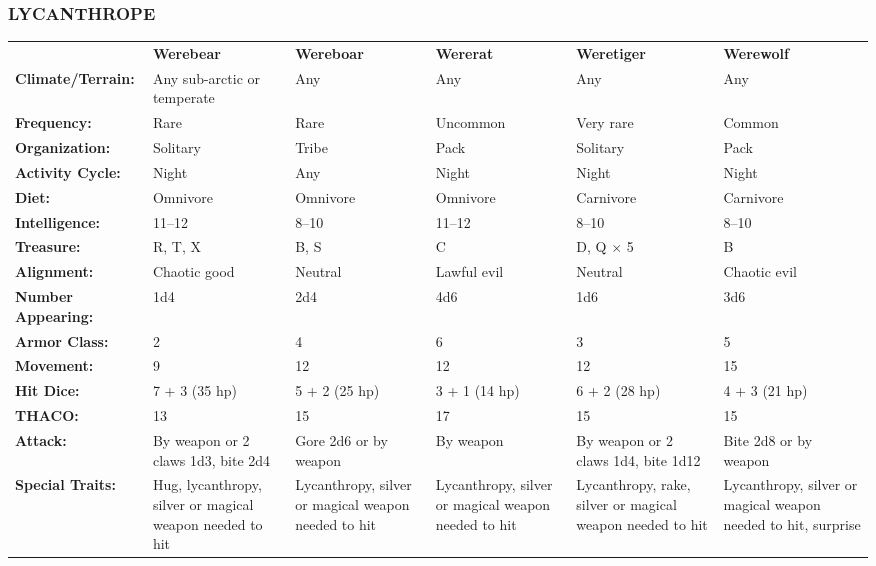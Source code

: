 \noindent
\begin{minipage}{\columnwidth}

\vspace{1em}

\subsubsection{LYCANTHROPE}

\noindent \begin{tabular}{p{}g{.13\columnwidth}p{.14\columnwidth}g{.14\columnwidth}p{.13\columnwidth}g{.13\columnwidth}}
	& \textbf{Werebear}	& \textbf{Wereboar}	& \textbf{Wererat}	& \textbf{Weretiger}	& \textbf{Werewolf}	\\
\textbf{Climate/Terrain:}	& Any sub-arctic or temperate	& Any	& Any 	& Any	& Any	\\
\textbf{Frequency:} 		& Rare	& Rare	& Uncommon	& Very rare	& Common	\\
\textbf{Organization:} 		& Solitary	& Tribe	& Pack	& Solitary	& Pack	\\
\textbf{Activity Cycle:} 	& Night	& Any	& Night	& Night	& Night	\\
\textbf{Diet:} 				& Omnivore	& Omnivore	& Omnivore	& Carnivore	& Carnivore	\\
\textbf{Intelligence:} 		& 11--12	& 8--10	& 11--12	& 8--10	& 8--10	\\
\textbf{Treasure:} 			& R, T, X	& B, S	& C	& D, Q $\times$ 5	& B	\\
\textbf{Alignment:} 		& Chaotic good	& Neutral	& Lawful evil	& Neutral	& Chaotic evil	\\
\hline
\textbf{Number Appearing:} 	& 1d4	& 2d4	& 4d6	& 1d6	& 3d6	\\
\textbf{Armor Class:} 		& 2	& 4	& 6	& 3	& 5	\\
\textbf{Movement:} 			& 9	& 12	& 12	& 12	& 15	\\
\textbf{Hit Dice:} 			& 7 + 3 (35 hp)	& 5 + 2 (25 hp)	& 3 + 1 (14 hp)	& 6 + 2 (28 hp)	& 4 + 3 (21 hp)	\\
\textbf{THACO:} 			& 13	& 15	& 17	& 15	& 15	\\
\textbf{Attack:} 			& By weapon or 2 claws 1d3, bite 2d4	& Gore 2d6 or by weapon	& By weapon	& By weapon or 2 claws 1d4, bite 1d12	& Bite 2d8 or by weapon	\\
\textbf{Special Traits:} & Hug, lycanthropy, silver or magical weapon needed to hit	& Lycanthropy, silver or magical weapon needed to hit	& Lycanthropy, silver or magical weapon needed to hit	& Lycanthropy, rake, silver or magical weapon needed to hit	& Lycanthropy, silver or magical weapon needed to hit, surprise	\\

\end{tabular}
\end{minipage}
